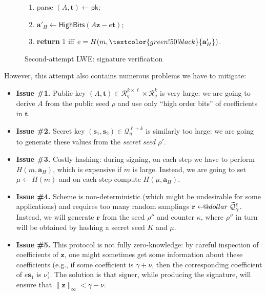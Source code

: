 \documentclass{template}
\makeatletter
\newcommand\leftarrowS{\leftarrow\joinrel\smalldollar}
\newcommand{\smalldollar}{\mathrel{\mathpalette\small@dollar\relax}}
\newcommand{\small@dollar}[2]{%
  \vcenter{\hbox{%
    $#1\textnormal{\fontsize{0.7\dimexpr\f@size pt}{0}\selectfont\$}$%
  }}%
}
\makeatother
\begin{document}
\begin{figure}[ht]
\begin{minipage}[t]{0.4\linewidth}
\begin{mdframed}[linecolor=black, linewidth=1.0pt,
                     skipabove=5pt, skipbelow=5pt,
                     innerleftmargin=5pt, innerrightmargin=5pt]
\begin{enumerate}
            \item parse $(A,\mathbf{t}) \gets \mathsf{pk}$;
            \item \textcolor{green!50!black}{$\mathbf{a}'_H \gets \mathsf{HighBits}(A\mathbf{z} - e\mathbf{t})$};
            \item \textbf{return} $1$ iff $e=H(m,\textcolor{green!50!black}{\mathbf{a}'_H})$.
        \end{enumerate}
    \end{mdframed}
    \caption{Second-attempt LWE: signature verification}
    \label{fig:second-attempt-verify}
\end{minipage}
\end{figure}

However,
this attempt also contains numerous problems we have to mitigate:
\begin{itemize}
    \item \textbf{Issue \#1.} Public key $(A,\mathbf{t}) \in \mathcal{R}_q^{k
    \times \ell} \times \mathcal{R}_q^k$ is very large: we are going to derive
    $A$ from the public seed $\rho$ and use only ``high order bits'' of
    coefficients in $\mathbf{t}$.
    \item \textbf{Issue \#2.} Secret key $(\mathbf{s}_1,\mathbf{s}_2) \in
    \mathcal{Q}_{\eta}^{\ell+k}$ is similarly too large: we are going to
    generate these values from the \textit{secret seed $\rho'$}.
    \item \textbf{Issue \#3.} Costly hashing: during signing, on each step we
    have to perform $H(m,\mathbf{a}_H)$, which is expensive if $m$ is large.
    Instead, we are going to set $\mu \gets H(m)$ and on each step compute
    $H(\mu,\mathbf{a}_H)$.
    \item \textbf{Issue \#4.} Scheme is non-deterministic (which might be
    undesirable for some applications) and requires too many random samplings
    $\mathbf{r} \leftarrowS \widetilde{\mathcal{Q}}_{\gamma}^{\ell}$. Instead,
    we will generate $\mathbf{r}$ from the seed $\rho''$ and counter $\kappa$,
    where $\rho''$ in turn will be obtained by hashing a secret seed $K$ and
    $\mu$.
    \item \textbf{Issue \#5.} This protocol is not fully zero-knowledge: by
    careful inspection of coefficients of $\mathbf{z}$, one might sometimes get
    some information about these coefficients (e.g., if some coefficient is
    $\gamma+\nu$, then the corresponding coefficient of $e\mathbf{s}_1$ is
    $\nu$). The solution is that signer, while producing the signature, will
    ensure that $\|\mathbf{z}\|_{\infty} < \gamma-\nu$.
\end{itemize}
\end{document}

